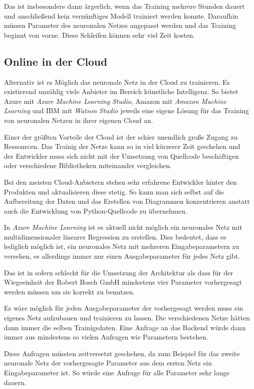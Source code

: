 Das ist insbesondere dann ärgerlich, wenn das Training mehrere Stunden dauert und anschließend kein vernünftiges Modell
trainiert werden konnte. Daraufhin müssen Parameter des neuronalen Netzes angepasst werden und das Training beginnt von
vorne. Diese Schleifen können sehr viel Zeit kosten.

\subsection{Online in der Cloud}
Alternativ ist es Möglich das neuronale Netz in der Cloud zu trainieren. Es existierend unzählig viele Anbieter im
Bereich künstliche Intelligenz. So bietet Azure mit \textit{Azure Machine Learning Studio}, Amazon mit
\textit{Amazon Machine Learning} und IBM mit \textit{Watson Studio} jeweils eine eigene Lösung für das Training von
neuronalen Netzen in ihrer eigenen Cloud an.

Einer der größten Vorteile der Cloud ist der schier unendlich große Zugang zu Ressourcen. Das Trainig der Netze kann so
in viel kürzerer Zeit geschehen und der Entwickler muss sich nicht mit der Umsetzung von Quellcode beschäftigen oder
verschiedene Bibliotheken miteinander vergleichen.

Bei den meisten Cloud-Anbietern stehen sehr erfahrene Entwickler hinter den Produkten und aktualisieren diese stetig. So
kann man sich selbst auf die Aufbereitung der Daten und das Erstellen von Diagrammen konzentrieren anstatt auch die
Entwicklung von Python-Quellcode zu übernehmen.

In \textit{Azure Machine Learning} ist es aktuell nicht möglich ein neuronales Netz mit multidimensionaler linearer
Regression zu erstellen. Dies bedeutet, dass es lediglich möglich ist, ein neuronales Netz mit mehreren
Eingabeparametern zu versehen, es allerdings immer nur einen Ausgabeparameter für jedes Netz gibt.

Das ist in sofern schlecht für die Umsetzung der Architektur als dass für der Wiegeeinheit der Robert Bosch GmbH
mindestens vier Parameter vorhergesagt werden müssen um sie korrekt zu benutzen.

Es wäre möglich für jeden Ausgabeparameter der vorhergesagt werden muss ein eigenes Netz aufzubauen und trainieren zu
lassen. Die verschiedenen Netze hätten dann immer die selben Trainigsdaten. Eine Anfrage an das Backend würde dann immer
aus mindestens so vielen Anfragen wie Parametern bestehen.

Diese Anfragen müssten zeitversetzt geschehen, da zum Beispiel für das zweite neuronale Netz der vorhergesagte Parameter
aus dem ersten Netz ein Eingabeparameter ist. So würde eine Anfrage für alle Parameter sehr lange dauern.

